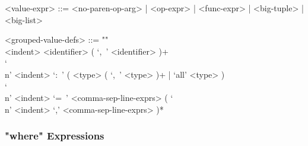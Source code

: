 \documentclass{article}
\begin{document}
\begin{itemize}
\begin{grammar}
<value-expr> ::=
<no-paren-op-arg> | <op-expr> | <func-expr> | <big-tuple> | <big-list>

<grouped-value-defs> ::= ""\\
<indent> <identifier> ( `,\ ' <identifier> )+ \\
`\\n' <indent> `:\ ' ( <type> ( `,\ ' <type> )+ | `all' <type> ) \\
`\\n' <indent> `=\ '
<comma-sep-line-exprs> ( `\\n' <indent> `,' <comma-sep-line-exprs> )*
\end{grammar}

\end{itemize}

\subsubsection{"where" Expressions}
\end{document}
